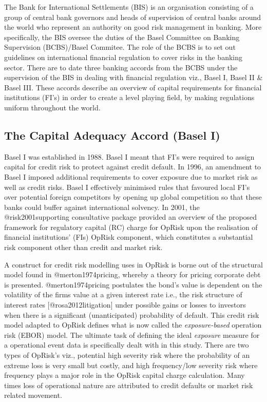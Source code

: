 \documentclass[]{article}
\begin{document}
The Bank for International Settlements (BIS) is an organisation
consisting of a group of central bank governors and heads of supervision
of central banks around the world who represent an authority on good
risk management in banking. More specifically, the BIS oversee the
duties of the Basel Committee on Banking Supervision (BCBS)/Basel
Commitee. The role of the BCBS is to set out guidelines on international
financial regulation to cover risks in the banking sector. There are to
date three banking accords from the BCBS under the supervision of the
BIS in dealing with financial regulation viz., Basel I, Basel II \&
Basel III. These accords describe an overview of capital requirements
for financial institutions (FI's) in order to create a level playing
field, by making regulations uniform throughout the world.

\subsection{The Capital Adequacy Accord (Basel I)}

Basel I was established in 1988. Basel I meant that FI's were required
to assign capital for credit risk to protect against credit default. In
1996, an amendment to Basel I imposed additional requirements to cover
exposure due to market risk as well as credit risks. Basel I effectively
minimised rules that favoured local FI's over potential foreign
competitors by opening up global competition so that these banks could
buffer against international solvency. In 2001, the @risk2001supporting
consultative package provided an overview of the proposed framework for
regulatory capital (RC) charge for OpRisk upon the realisation of
financial institutions' (FIs) OpRisk component, which constitutes a
substantial risk component other than credit and market risk. \medskip

A construct for credit risk modelling uses in OpRisk is borne out of the
structural model found in @merton1974pricing, whereby a theory for
pricing corporate debt is presented. @merton1974pricing postulates the
bond's value is dependent on the volatility of the firms value at a
given interest rate i.e., the risk structure of interest rates
{[}@rosa2012litigation{]} under possible gains or losses to investors
when there is a significant (unanticipated) probability of default. This
credit risk model adapted to OpRisk defines what is now called the
\emph{exposure-based} operation risk (EBOR) model. The ultimate task of
defining the ideal \emph{exposure} measure for a operational event data
is specifically dealt with in this study. There are two types of
OpRisk's viz., potential high severity risk where the probability of an
extreme loss is very small but costly, and high frequency/low severity
risk where frequency plays a major role in the OpRisk capital charge
calculation. Many times loss of operational nature are attributed to
credit defaults or market risk related movement.\medskip
\end{document}
